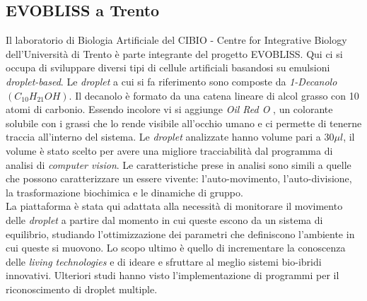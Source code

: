 \subsection{EVOBLISS a Trento}
\label{sec:trento}
Il laboratorio di Biologia Artificiale del CIBIO - Centre for Integrative Biology dell'Università di Trento è parte integrante del progetto EVOBLISS.
Qui ci si occupa di sviluppare diversi tipi di cellule artificiali basandosi su emulsioni \emph{droplet-based}. 
Le \emph{droplet} a cui si fa riferimento sono composte da \emph{1-Decanolo} $(C_{10}H_{21}OH)$. Il decanolo è formato da una catena lineare di alcol grasso con 10 atomi di carbonio.\cite{decanolo} Essendo incolore vi si aggiunge \emph{Oil Red O} \cite{oilredo}, un colorante solubile con i grassi che lo rende visibile all'occhio umano e ci permette di tenerne traccia all'interno del sistema. Le \emph{droplet} analizzate hanno volume pari a $30\mu l$, il volume è stato scelto per avere una migliore  tracciabilità dal programma di analisi di \emph{computer vision}.
Le caratteristiche prese in analisi sono simili a quelle che possono caratterizzare un essere vivente: l'auto-movimento, l'auto-divisione, la trasformazione biochimica e le dinamiche di gruppo.
\\La piattaforma è stata qui adattata alla necessità di monitorare il movimento delle \emph{droplet} a partire dal momento in cui queste escono da un sistema di equilibrio, studiando l'ottimizzazione dei parametri che definiscono l'ambiente in cui queste si muovono. Lo scopo ultimo è quello di incrementare la conoscenza delle \emph{living technologies} e di ideare e sfruttare al meglio sistemi bio-ibridi innovativi.
Ulteriori studi hanno visto l'implementazione di programmi per il riconoscimento di droplet multiple. 
 















